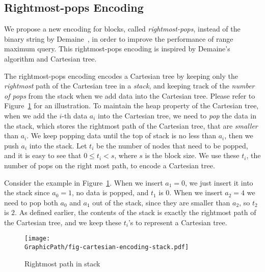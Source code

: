 
\subsection{Rightmost-pops Encoding} \label{sec:cct}

We propose a new encoding for blocks, called {\em rightmost-pops},
instead of the binary string by Demaine~\cite{Demaine2009OnCT}, in order
to improve the performance of range maximum query.  This rightmost-pops
encoding is inspired by Demaine's algorithm and Cartesian tree.

The rightmost-pops encoding encodes a Cartesian tree by keeping only
the {\em rightmost} path of the Cartesian tree in a {\em stack}, and
keeping track of the {\em number of pops} from the stack when we add
data into the Cartesian tree.  Please refer to
Figure~\ref{fig:interval-cartesian} for an illustration.  To maintain
the heap property of the Cartesian tree, when we add the $i$-th data
$a_i$ into the Cartesian tree, we need to {\em pop} the data in the
stack, which stores the rightmost path of the Cartesian tree, that are
{\em smaller} than $a_i$.  We keep popping data until the top of stack
is no less than $a_i$, then we push $a_i$ into the stack.  Let $t_i$
be the number of nodes that need to be popped, and it is easy to see
that $0 \le t_i < s$, where $s$ is the block size.  We use these
$t_i$, the number of pops on the right most path, to encode a
Cartesian tree.

Consider the example in Figure~\ref{fig:interval-cartesian}.  When we
insert $a_1 = 0$, we just insert it into the stack since $a_0 = 1$, no
data is popped, and $t_1$ is $0$.  When we insert $a_2 = 4$ we need to
pop both $a_0$ and $a_1$ out of the stack, since they are smaller than
$a_2$, so $t_2$ is $2$.  As defined earlier, the contents of the stack
is exactly the rightmost path of the Cartesian tree, and we keep these
$t_i$'s to represent a Cartesian tree.

\begin{figure}[!thb]
  \centering
  \texttt{[image: \\GraphicPath/fig-cartesian-encoding-stack.pdf]}
  \caption{Rightmost path in stack}
  \label{fig:interval-cartesian}
\end{figure}


